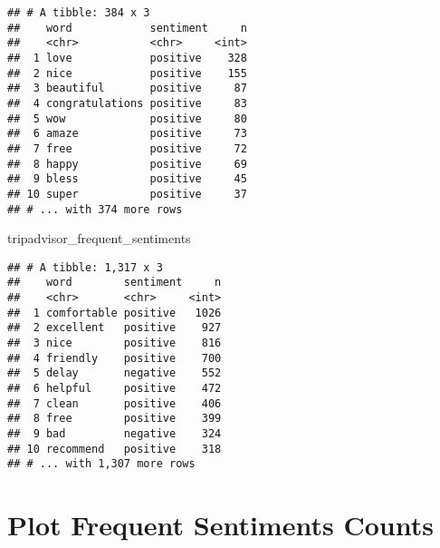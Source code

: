 \documentclass[]{article}
\newenvironment{Shaded}{\begin{snugshade}}{\end{snugshade}}
\newcommand{\NormalTok}[1]{#1}
\begin{document}
\begin{verbatim}
## # A tibble: 384 x 3
##    word            sentiment     n
##    <chr>           <chr>     <int>
##  1 love            positive    328
##  2 nice            positive    155
##  3 beautiful       positive     87
##  4 congratulations positive     83
##  5 wow             positive     80
##  6 amaze           positive     73
##  7 free            positive     72
##  8 happy           positive     69
##  9 bless           positive     45
## 10 super           positive     37
## # ... with 374 more rows
\end{verbatim}

\begin{Shaded}
\begin{Highlighting}[]
\NormalTok{tripadvisor_frequent_sentiments}
\end{Highlighting}
\end{Shaded}

\begin{verbatim}
## # A tibble: 1,317 x 3
##    word        sentiment     n
##    <chr>       <chr>     <int>
##  1 comfortable positive   1026
##  2 excellent   positive    927
##  3 nice        positive    816
##  4 friendly    positive    700
##  5 delay       negative    552
##  6 helpful     positive    472
##  7 clean       positive    406
##  8 free        positive    399
##  9 bad         negative    324
## 10 recommend   positive    318
## # ... with 1,307 more rows
\end{verbatim}

\section{Plot Frequent Sentiments
Counts}\label{plot-frequent-sentiments-counts}
\end{document}
